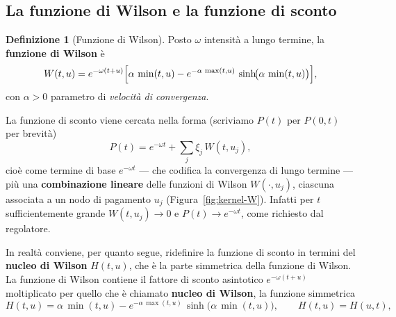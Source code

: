 \documentclass[11pt,a4paper]{article}
\theoremstyle{plain}
\theoremstyle{definition}
\newtheorem{definizione}[teorema]{Definizione}
\theoremstyle{remark}
\begin{document}
\subsection{La funzione di Wilson e la funzione di sconto}
\label{sub:kernel-W}

\begin{definizione}[Funzione di Wilson]
Posto $\omega$ intensit\`a a lungo termine, la \textbf{funzione di Wilson} \`e
\[
  W(t,u) = e^{-\omega(t+u)}\Bigl[\alpha\,\min(t,u)
           - e^{-\alpha\,\max(t,u)}\,\sinh\!\bigl(\alpha\,\min(t,u)\bigr)\Bigr],
\]
con $\alpha>0$ parametro di \emph{velocit\`a di convergenza}. 

\end{definizione}

La funzione di sconto viene cercata nella forma (scriviamo $P(t)$ per $P(0,t)$ per brevit\`a)
\begin{equation}
  P(t) = e^{-\omega t} + \textstyle\sum_{j} \xi_j\, W(t,u_j),
  \label{eq:sw-P-W}
\end{equation}
cio\`e come termine di base $e^{-\omega t}$ --- che codifica la convergenza di lungo termine --- pi\`u
una \textbf{combinazione lineare} delle funzioni di Wilson $W(\cdot,u_j)$, ciascuna associata
a un nodo di pagamento $u_j$ (Figura~\ref{fig:kernel-W}). Infatti per $t$ sufficientemente grande $W(t,u_j)\to 0$ e $P(t)\to e^{-\omega t}$, 
come richiesto dal regolatore.

In realtà conviene, per quanto segue, ridefinire la funzione di sconto in termini del \textbf{nucleo di Wilson} $H(t,u)$, 
che \`e la parte simmetrica della funzione di Wilson.
La funzione di Wilson contiene il fattore di sconto asintotico $e^{-\omega(t+u)}$ moltiplicato
per quello che è chiamato \textbf{nucleo di Wilson}, la funzione simmetrica
\begin{equation}
  H(t,u) = \alpha\,\min(t,u) - e^{-\alpha\,\max(t,u)}\,\sinh\!\bigl(\alpha\,\min(t,u)\bigr),
  \qquad H(t,u) = H(u,t),
\end{equation}
\end{document}
